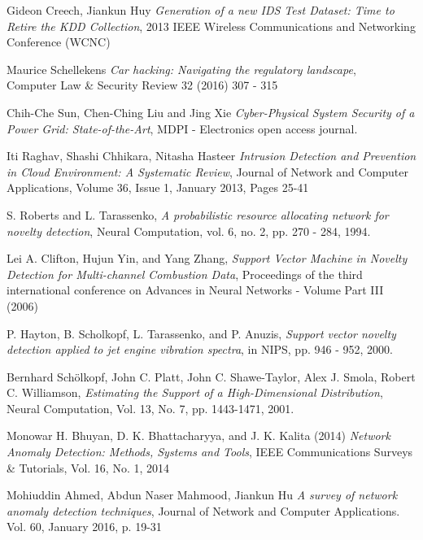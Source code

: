 \documentclass[reqno,openany,12pt]{amsbook}
\begin{document}
 
\begin{thebibliography}{99}


 Gideon Creech, Jiankun Huy \emph{Generation of a new IDS Test Dataset: Time to Retire the KDD Collection}, 
2013 IEEE Wireless Communications and Networking Conference (WCNC)

 Maurice Schellekens \emph{Car hacking: Navigating the regulatory landscape},\\ Computer Law \& Security Review 32 (2016) 307 - 315

 Chih-Che Sun, Chen-Ching Liu and Jing Xie \emph{Cyber-Physical System Security of a Power Grid: State-of-the-Art}, MDPI - Electronics open access journal.

 Iti Raghav, Shashi Chhikara, Nitasha Hasteer \emph{Intrusion Detection and Prevention in Cloud Environment: A Systematic Review}, Journal of Network and Computer Applications, Volume 36, Issue 1, January 2013, Pages 25-41

 S. Roberts and L. Tarassenko, \emph{A probabilistic resource allocating
network for novelty detection}, Neural Computation, vol. 6, no. 2,
pp. 270 - 284, 1994.

 Lei A. Clifton, Hujun Yin, and Yang Zhang, \emph{Support Vector Machine in Novelty Detection for Multi-channel Combustion Data}, Proceedings of the third international conference on Advances in Neural Networks - Volume Part III (2006)

 P. Hayton, B. Scholkopf, L. Tarassenko, and P. Anuzis, \emph{Support vector novelty detection applied to jet engine vibration spectra}, in NIPS, pp. 946 - 952, 2000.

 	Bernhard Schölkopf, John C. Platt, John C. Shawe-Taylor, Alex J. Smola, Robert C. Williamson, \emph{Estimating the Support of a High-Dimensional Distribution}, Neural Computation, Vol. 13, No. 7, pp. 1443-1471, 2001.


 Monowar H. Bhuyan, D. K. Bhattacharyya, and J. K. Kalita (2014) \emph{Network Anomaly Detection: Methods, Systems and Tools}, IEEE Communications Surveys \& Tutorials, Vol. 16, No. 1, 2014

 Mohiuddin Ahmed, Abdun Naser Mahmood, Jiankun Hu \emph{A survey of network anomaly detection techniques}, Journal of Network and Computer Applications. Vol. 60, January 2016, p. 19-31


\end{thebibliography}
\end{document}

